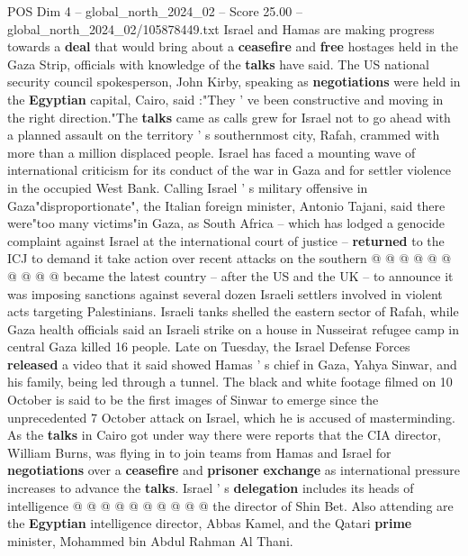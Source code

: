 \begin{textsample}{POS Dim 4 – global\_north\_2024\_02 – Score 25.00 – global\_north\_2024\_02/105878449.txt}  \label{ex:f4_pos_173}
Israel and Hamas are making progress towards a \textbf{deal} that would bring about a \textbf{ceasefire} and \textbf{free} hostages held in the Gaza Strip, officials with knowledge of the \textbf{talks} have said.
The US national security council spokesperson, John Kirby, speaking as \textbf{negotiations} were held in the \textbf{Egyptian} capital, Cairo, said :"They ' ve been constructive and moving in the right direction."The \textbf{talks} came as calls grew for Israel not to go ahead with a planned assault on the territory ' s southernmost city, Rafah, crammed with more than a million displaced people.
Israel has faced a mounting wave of international criticism for its conduct of the war in Gaza and for settler violence in the occupied West Bank.
Calling Israel ' s military offensive in Gaza"disproportionate", the Italian foreign minister, Antonio Tajani, said there were"too many victims"in Gaza, as South Africa -- which has lodged a genocide complaint against Israel at the international court of justice -- \textbf{returned} to the ICJ to demand it take action over recent attacks on the southern @ @ @ @ @ @ @ @ @ @ became the latest country -- after the US and the UK -- to announce it was imposing sanctions against several dozen Israeli settlers involved in violent acts targeting Palestinians.
Israeli tanks shelled the eastern sector of Rafah, while Gaza health officials said an Israeli strike on a house in Nusseirat refugee camp in central Gaza killed 16 people.
Late on Tuesday, the Israel Defense Forces \textbf{released} a video that it said showed Hamas ' s chief in Gaza, Yahya Sinwar, and his family, being led through a tunnel.
The black and white footage filmed on 10 October is said to be the first images of Sinwar to emerge since the unprecedented 7 October attack on Israel, which he is accused of masterminding.
As the \textbf{talks} in Cairo got under way there were reports that the CIA director, William Burns, was flying in to join teams from Hamas and Israel for \textbf{negotiations} over a \textbf{ceasefire} and \textbf{prisoner} \textbf{exchange} as international pressure increases to advance the \textbf{talks}.
Israel ' s \textbf{delegation} includes its heads of intelligence @ @ @ @ @ @ @ @ @ @ the director of Shin Bet.
Also attending are the \textbf{Egyptian} intelligence director, Abbas Kamel, and the Qatari \textbf{prime} minister, Mohammed bin Abdul Rahman Al Thani.

\end{textsample}
